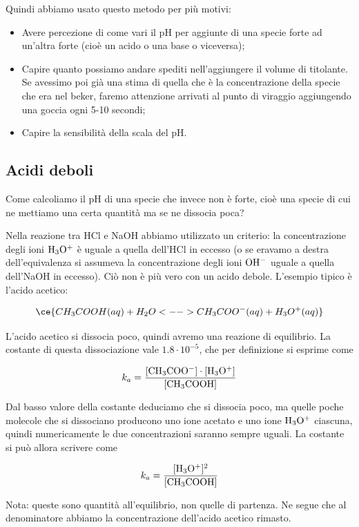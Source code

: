 \vspace{0.2cm}Quindi abbiamo usato questo metodo per più motivi:

\begin{itemize}
    \item Avere percezione di come vari il pH per aggiunte di una specie forte ad un'altra forte (cioè un acido o una base o viceversa);
    \item Capire quanto possiamo andare spediti nell'aggiungere il volume di titolante. Se avessimo poi già una stima di quella che è la concentrazione della specie che era nel beker, faremo attenzione arrivati al punto di viraggio aggiungendo una goccia ogni 5-10 secondi;
    \item Capire la sensibilità della scala del pH.
\end{itemize}

\subsection{Acidi deboli}
Come calcoliamo il pH di una specie che invece non è forte, cioè una specie di cui ne mettiamo una certa quantità ma se ne dissocia poca?

Nella reazione tra HCl e NaOH abbiamo utilizzato un criterio: la concentrazione degli ioni $\rm H_3O^+$ è uguale a quella dell'HCl in eccesso (o se eravamo a destra dell'equivalenza si assumeva la concentrazione degli ioni $\rm OH^-$ uguale a quella dell'NaOH in eccesso). Ciò non è più vero con un acido debole. L'esempio tipico è l'acido acetico:

$$\ce{CH_3COOH(aq) + H_2O <--> CH_3COO^-(aq) + H_3O^+(aq)}$$

L'acido acetico si dissocia poco, quindi avremo una reazione di equilibrio. La costante di questa dissociazione vale $1.8 \cdot 10^{-5}$, che per definizione si esprime come

$$k_a=\frac{\rm{[CH_3COO^-]} \cdot \rm{[H_3O^+]}}{\rm{[CH_3COOH]}}$$

Dal basso valore della costante deduciamo che si dissocia poco, ma quelle poche molecole che si dissociano producono uno ione acetato e uno ione $\rm H_3O^+$ ciascuna, quindi numericamente le due concentrazioni saranno sempre uguali. La costante si può allora scrivere come

$$k_a=\frac{\rm{[H_3O^+]^2}}{\rm{[CH_3COOH]}}$$

Nota: queste sono quantità all'equilibrio, non quelle di partenza. Ne segue che al denominatore abbiamo la concentrazione dell'acido acetico rimasto.

